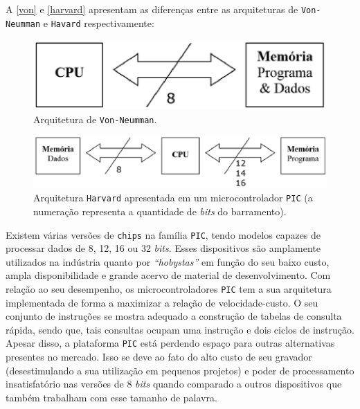 A \autoref{von} e \autoref{harvard} apresentam as diferenças entre as arquiteturas de \texttt{Von-Neumman} e \texttt{Havard} respectivamente:

\begin{figure}[h]
	\centering
	\caption{\label{von}Arquitetura de \texttt{Von-Neumman}.}
		\includegraphics[keepaspectratio=true,scale=1]{figuras/von.eps}
\end{figure}

\begin{figure}[h]
	\centering
	\caption{\label{harvard}Arquitetura \texttt{Harvard} apresentada em um microcontrolador \texttt{PIC} (a numeração representa a quantidade de \textit{bits} do barramento).}
		\includegraphics[keepaspectratio=true,scale=1]{figuras/harvard.eps}
\end{figure}

Existem várias versões de \texttt{chips} na família \texttt{PIC}, tendo modelos capazes de processar dados de 8, 12, 16 ou 32 \textit{bits}. Esses dispositivos são amplamente utilizados na indústria quanto por \textit{“hobystas”} em função do seu baixo custo, ampla disponibilidade e grande acervo de material de desenvolvimento. 
Com relação ao seu desempenho, os microcontroladores \texttt{PIC} tem a sua arquitetura implementada de forma a maximizar a relação de velocidade-custo. O seu conjunto de instruções se mostra adequado a construção de tabelas de consulta rápida, sendo que, tais consultas ocupam uma instrução e dois ciclos de instrução. 
 Apesar disso, a plataforma \texttt{PIC} está perdendo espaço para outras alternativas presentes no mercado. Isso se deve ao fato do alto custo de seu gravador (desestimulando a sua utilização em pequenos projetos) e poder de processamento insatisfatório nas versões de 8 \textit{bits} quando comparado a outros dispositivos que também trabalham com esse tamanho de palavra.

